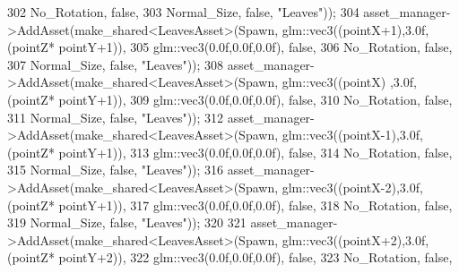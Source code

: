 \begin{DoxyCode}
302                                                              No\_Rotation, \textcolor{keyword}{false},
303                                                              Normal\_Size, \textcolor{keyword}{false}, \textcolor{stringliteral}{"Leaves"}));
304             asset\_manager->AddAsset(make\_shared<LeavesAsset>(Spawn, glm::vec3((pointX+1),3.0f,(pointZ*
      pointY+1)),
305                                                              glm::vec3(0.0f,0.0f,0.0f), \textcolor{keyword}{false},
306                                                              No\_Rotation, \textcolor{keyword}{false},
307                                                              Normal\_Size, \textcolor{keyword}{false}, \textcolor{stringliteral}{"Leaves"}));
308             asset\_manager->AddAsset(make\_shared<LeavesAsset>(Spawn, glm::vec3((pointX)  ,3.0f,(pointZ*
      pointY+1)),
309                                                              glm::vec3(0.0f,0.0f,0.0f), \textcolor{keyword}{false},
310                                                              No\_Rotation, \textcolor{keyword}{false},
311                                                              Normal\_Size, \textcolor{keyword}{false}, \textcolor{stringliteral}{"Leaves"}));
312             asset\_manager->AddAsset(make\_shared<LeavesAsset>(Spawn, glm::vec3((pointX-1),3.0f,(pointZ*
      pointY+1)),
313                                                              glm::vec3(0.0f,0.0f,0.0f), \textcolor{keyword}{false},
314                                                              No\_Rotation, \textcolor{keyword}{false},
315                                                              Normal\_Size, \textcolor{keyword}{false}, \textcolor{stringliteral}{"Leaves"}));
316             asset\_manager->AddAsset(make\_shared<LeavesAsset>(Spawn, glm::vec3((pointX-2),3.0f,(pointZ*
      pointY+1)),
317                                                              glm::vec3(0.0f,0.0f,0.0f), \textcolor{keyword}{false},
318                                                              No\_Rotation, \textcolor{keyword}{false},
319                                                              Normal\_Size, \textcolor{keyword}{false}, \textcolor{stringliteral}{"Leaves"}));
320  
321             asset\_manager->AddAsset(make\_shared<LeavesAsset>(Spawn, glm::vec3((pointX+2),3.0f,(pointZ*
      pointY+2)),
322                                                              glm::vec3(0.0f,0.0f,0.0f), \textcolor{keyword}{false},
323                                                              No\_Rotation, \textcolor{keyword}{false},

\end{DoxyCode}
